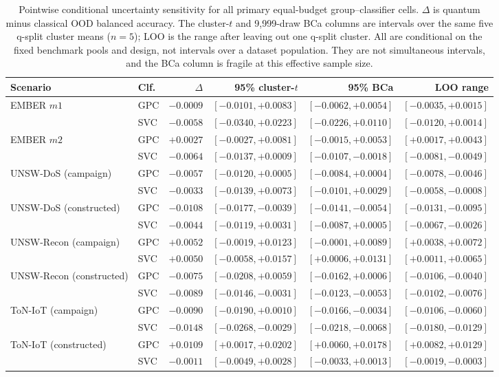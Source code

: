 \documentclass[11pt]{article}
\begin{document}
\begin{table}[ht]
\centering
\caption{Pointwise conditional uncertainty sensitivity for all primary equal-budget
group--classifier cells. $\Delta$ is quantum minus classical OOD balanced
accuracy. The cluster-$t$ and 9,999-draw BCa columns are intervals over the
same five q-split cluster means ($n=5$); LOO is the range after leaving out
one q-split cluster. All are conditional on the fixed benchmark pools and
design, not intervals over a dataset population. They are not simultaneous
intervals, and the BCa column is fragile at this effective sample size.}
\label{supp:tab_intervals}
\scriptsize
\setlength{\tabcolsep}{3.0pt}
\begin{tabular}{llrrrr}
\toprule
Scenario & Clf. & $\Delta$ & 95\% cluster-$t$ & 95\% BCa & LOO range \\
\midrule
\multirow{2}{*}{EMBER $m1$}
 & GPC & $-0.0009$ & $[-0.0101,+0.0083]$ & $[-0.0062,+0.0054]$ & $[-0.0035,+0.0015]$ \\
 & SVC & $-0.0058$ & $[-0.0340,+0.0223]$ & $[-0.0226,+0.0110]$ & $[-0.0120,+0.0014]$ \\
\multirow{2}{*}{EMBER $m2$}
 & GPC & $+0.0027$ & $[-0.0027,+0.0081]$ & $[-0.0015,+0.0053]$ & $[+0.0017,+0.0043]$ \\
 & SVC & $-0.0064$ & $[-0.0137,+0.0009]$ & $[-0.0107,-0.0018]$ & $[-0.0081,-0.0049]$ \\
\multirow{2}{*}{UNSW-DoS (campaign)}
 & GPC & $-0.0057$ & $[-0.0120,+0.0005]$ & $[-0.0084,+0.0004]$ & $[-0.0078,-0.0046]$ \\
 & SVC & $-0.0033$ & $[-0.0139,+0.0073]$ & $[-0.0101,+0.0029]$ & $[-0.0058,-0.0008]$ \\
\multirow{2}{*}{UNSW-DoS (constructed)}
 & GPC & $-0.0108$ & $[-0.0177,-0.0039]$ & $[-0.0141,-0.0054]$ & $[-0.0131,-0.0095]$ \\
 & SVC & $-0.0044$ & $[-0.0119,+0.0031]$ & $[-0.0087,+0.0005]$ & $[-0.0067,-0.0026]$ \\
\multirow{2}{*}{UNSW-Recon (campaign)}
 & GPC & $+0.0052$ & $[-0.0019,+0.0123]$ & $[-0.0001,+0.0089]$ & $[+0.0038,+0.0072]$ \\
 & SVC & $+0.0050$ & $[-0.0058,+0.0157]$ & $[+0.0006,+0.0131]$ & $[+0.0011,+0.0065]$ \\
\multirow{2}{*}{UNSW-Recon (constructed)}
 & GPC & $-0.0075$ & $[-0.0208,+0.0059]$ & $[-0.0162,+0.0006]$ & $[-0.0106,-0.0040]$ \\
 & SVC & $-0.0089$ & $[-0.0146,-0.0031]$ & $[-0.0123,-0.0053]$ & $[-0.0102,-0.0076]$ \\
\multirow{2}{*}{ToN-IoT (campaign)}
 & GPC & $-0.0090$ & $[-0.0190,+0.0010]$ & $[-0.0166,-0.0034]$ & $[-0.0106,-0.0060]$ \\
 & SVC & $-0.0148$ & $[-0.0268,-0.0029]$ & $[-0.0218,-0.0068]$ & $[-0.0180,-0.0129]$ \\
\multirow{2}{*}{ToN-IoT (constructed)}
 & GPC & $+0.0109$ & $[+0.0017,+0.0202]$ & $[+0.0060,+0.0178]$ & $[+0.0082,+0.0129]$ \\
 & SVC & $-0.0011$ & $[-0.0049,+0.0028]$ & $[-0.0033,+0.0013]$ & $[-0.0019,-0.0003]$ \\
\bottomrule
\end{tabular}
\end{table}
\end{document}
